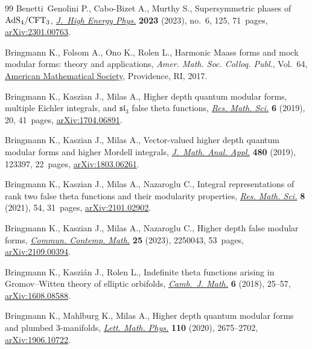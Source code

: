 \documentclass[pdftex]{sigma}
\theoremstyle{definition}
\numberwithin{equation}{section}
\begin{document}
\begin{thebibliography}{99}
Benetti~Genolini P., Cabo-Bizet A., Murthy S., Supersymmetric phases of {${\rm
 AdS}_4/{\rm CFT}_3$}, \href{https://doi.org/10.1007/jhep06(2023)125}{\textit{J.~High Energy Phys.}} \textbf{2023} (2023),
 no.~6, 125, 71~pages, \href{https://arxiv.org/abs/2301.00763}{arXiv:2301.00763}.

Bringmann K., Folsom A., Ono K., Rolen L., Harmonic {M}aass forms and mock
 modular forms: theory and applications, \textit{Amer. Math. Soc. Colloq.
 Publ.}, Vol.~64, \href{https://doi.org/10.1090/coll/064}{American Mathematical Society}, Providence, RI, 2017.

Bringmann K., Kaszian J., Milas A., Higher depth quantum modular forms,
 multiple {E}ichler integrals, and {$\mathfrak{sl}_3$} false theta functions,
 \href{https://doi.org/10.1007/s40687-019-0182-4}{\textit{Res. Math. Sci.}} \textbf{6} (2019), 20, 41~pages,
 \href{https://arxiv.org/abs/1704.06891}{arXiv:1704.06891}.

Bringmann K., Kaszian J., Milas A., Vector-valued higher depth quantum modular
 forms and higher {M}ordell integrals, \href{https://doi.org/10.1016/j.jmaa.2019.123397}{\textit{J.~Math. Anal. Appl.}}
 \textbf{480} (2019), 123397, 22~pages, \href{https://arxiv.org/abs/1803.06261}{arXiv:1803.06261}.

Bringmann K., Kaszian J., Milas A., Nazaroglu C., Integral representations of
 rank two false theta functions and their modularity properties, \href{https://doi.org/10.1007/s40687-021-00284-1}{\textit{Res.
 Math. Sci.}} \textbf{8} (2021), 54, 31~pages, \href{https://arxiv.org/abs/2101.02902}{arXiv:2101.02902}.

Bringmann K., Kaszian J., Milas A., Nazaroglu C., Higher depth false modular
 forms, \href{https://doi.org/10.1142/S0219199722500432}{\textit{Commun. Contemp. Math.}} \textbf{25} (2023), 2250043, 53~pages,
 \href{https://arxiv.org/abs/2109.00394}{arXiv:2109.00394}.

Bringmann K., Kaszi\'an J., Rolen L., Indefinite theta functions arising in
 {G}romov--{W}itten theory of elliptic orbifolds, \href{https://doi.org/10.4310/CJM.2018.v6.n1.a2}{\textit{Camb.~J. Math.}}
 \textbf{6} (2018), 25--57, \href{https://arxiv.org/abs/1608.08588}{arXiv:1608.08588}.

Bringmann K., Mahlburg K., Milas A., Higher depth quantum modular forms and
 plumbed 3-manifolds, \href{https://doi.org/10.1007/s11005-020-01310-z}{\textit{Lett. Math. Phys.}} \textbf{110} (2020),
 2675--2702, \href{https://arxiv.org/abs/1906.10722}{arXiv:1906.10722}.


\end{thebibliography}
\end{document}
